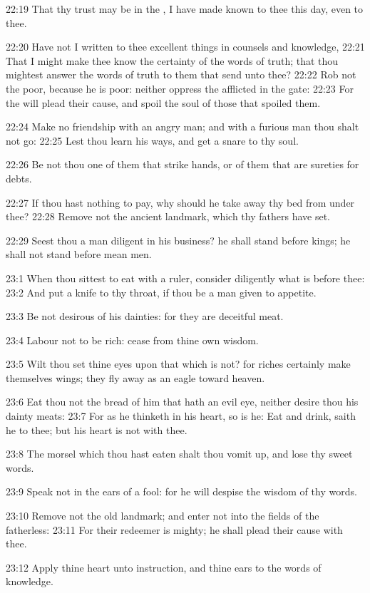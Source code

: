 22:19 That thy trust may be in the \LORD, I have made known to thee this day, even to thee.

22:20 Have not I written to thee excellent things in counsels and knowledge, 22:21 That I might make thee know the certainty of the words of truth; that thou mightest answer the words of truth to them that send unto thee?  22:22 Rob not the poor, because he is poor: neither oppress the afflicted in the gate: 22:23 For the \LORD will plead their cause, and spoil the soul of those that spoiled them.

22:24 Make no friendship with an angry man; and with a furious man thou shalt not go: 22:25 Lest thou learn his ways, and get a snare to thy soul.

22:26 Be not thou one of them that strike hands, or of them that are sureties for debts.

22:27 If thou hast nothing to pay, why should he take away thy bed from under thee?  22:28 Remove not the ancient landmark, which thy fathers have set.

22:29 Seest thou a man diligent in his business? he shall stand before kings; he shall not stand before mean men.

23:1 When thou sittest to eat with a ruler, consider diligently what is before thee: 23:2 And put a knife to thy throat, if thou be a man given to appetite.

23:3 Be not desirous of his dainties: for they are deceitful meat.

23:4 Labour not to be rich: cease from thine own wisdom.

23:5 Wilt thou set thine eyes upon that which is not? for riches certainly make themselves wings; they fly away as an eagle toward heaven.

23:6 Eat thou not the bread of him that hath an evil eye, neither desire thou his dainty meats: 23:7 For as he thinketh in his heart, so is he: Eat and drink, saith he to thee; but his heart is not with thee.

23:8 The morsel which thou hast eaten shalt thou vomit up, and lose thy sweet words.

23:9 Speak not in the ears of a fool: for he will despise the wisdom of thy words.

23:10 Remove not the old landmark; and enter not into the fields of the fatherless: 23:11 For their redeemer is mighty; he shall plead their cause with thee.

23:12 Apply thine heart unto instruction, and thine ears to the words of knowledge.

